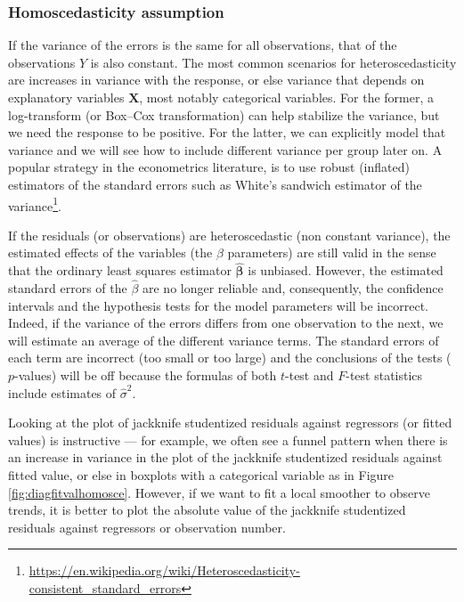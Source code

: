 \documentclass[
  11pt,
  letterpaper,
]{book}
\renewcommand{\href}[2]{#2\footnote{\url{#1}}}
\theoremstyle{definition}
\theoremstyle{definition}
\theoremstyle{definition}
\theoremstyle{definition}
\theoremstyle{remark}
\begin{document}
\hypertarget{homoscedasticity-assumption}{%
\subsubsection{Homoscedasticity assumption}\label{homoscedasticity-assumption}}

If the variance of the errors is the same for all observations, that of the observations \(Y\) is also constant. The most common scenarios for heteroscedasticity are increases in variance with the response, or else variance that depends on explanatory variables \(\mathbf{X}\), most notably categorical variables. For the former, a log-transform (or Box--Cox transformation) can help stabilize the variance, but we need the response to be positive. For the latter, we can explicitly model that variance and we will see how to include different variance per group later on. A popular strategy in the econometrics literature, is to use robust (inflated) estimators of the standard errors such as \href{https://en.wikipedia.org/wiki/Heteroscedasticity-consistent_standard_errors}{White's sandwich estimator of the variance}.

If the residuals (or observations) are heteroscedastic (non constant variance), the estimated effects of the variables (the \(\beta\) parameters) are still valid in the sense that the ordinary least squares estimator \(\widehat{\boldsymbol{\beta}}\) is unbiased. However, the estimated standard errors of the \(\widehat{\beta}\) are no longer reliable and, consequently, the confidence intervals and the hypothesis tests for the model parameters will be incorrect. Indeed, if the variance of the errors differs from one observation to the next, we will estimate an average of the different variance terms. The standard errors of each term are incorrect (too small or too large) and the conclusions of the tests (\(p\)-values) will be off because the formulas of both \(t\)-test and \(F\)-test statistics include estimates of \(\hat{\sigma}^2\).

Looking at the plot of jackknife studentized residuals against regressors (or fitted values) is instructive --- for example, we often see a funnel pattern when there is an increase in variance in the plot of the jackknife studentized residuals against fitted value, or else in boxplots with a categorical variable as in Figure \ref{fig:diagfitvalhomosce}.
However, if we want to fit a local smoother to observe trends, it is better to plot the absolute value of the jackknife studentized residuals against regressors or observation number.
\end{document}
